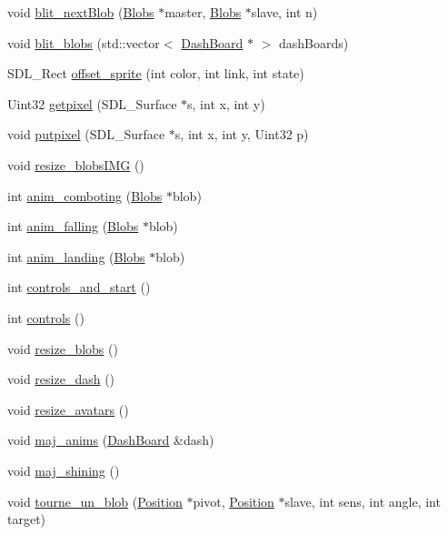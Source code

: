 \begin{DoxyCompactItemize}
\item 
void \hyperlink{a00011_a98196e7e039d0613d157349b7a16149f}{blit\_\-nextBlob} (\hyperlink{a00002}{Blobs} $\ast$master, \hyperlink{a00002}{Blobs} $\ast$slave, int n)
\item 
void \hyperlink{a00011_a30b3d0be2369fe70823507b30444401b}{blit\_\-blobs} (std::vector$<$ \hyperlink{a00006}{DashBoard} $\ast$ $>$ dashBoards)
\item 
SDL\_\-Rect \hyperlink{a00011_a4e2365dc147991810422dc3977b17d95}{offset\_\-sprite} (int color, int link, int state)
\item 
Uint32 \hyperlink{a00011_ad5f35be24aa0bcb7ad247d84056c1d1f}{getpixel} (SDL\_\-Surface $\ast$s, int x, int y)
\item 
void \hyperlink{a00011_a876abee7dcedec2e06d3a80cd482fd2b}{putpixel} (SDL\_\-Surface $\ast$s, int x, int y, Uint32 p)
\item 
void \hyperlink{a00011_a6cf97dcfc74a0bbcce08b6cf2b7a8aaa}{resize\_\-blobsIMG} ()
\item 
int \hyperlink{a00011_a9560986497eadbcec1245b55837b05c4}{anim\_\-comboting} (\hyperlink{a00002}{Blobs} $\ast$blob)
\item 
int \hyperlink{a00011_a9e3b255d376a942c02473defaf58c0d9}{anim\_\-falling} (\hyperlink{a00002}{Blobs} $\ast$blob)
\item 
int \hyperlink{a00011_ae177a43e82f45e6610d86baf7460da22}{anim\_\-landing} (\hyperlink{a00002}{Blobs} $\ast$blob)
\item 
int \hyperlink{a00011_a76916e87c447d621a562a766840fa0ba}{controls\_\-and\_\-start} ()
\item 
int \hyperlink{a00011_a518ceb8632ff76ce4a47e7a8955e82d1}{controls} ()
\item 
void \hyperlink{a00011_a836023020e0e313bd9fb00eee5dc8c91}{resize\_\-blobs} ()
\item 
void \hyperlink{a00011_a3d0e9c5cf58769f006904426dbde99be}{resize\_\-dash} ()
\item 
void \hyperlink{a00011_a1b054eb8feeb623d940e7c1400ea3417}{resize\_\-avatars} ()
\item 
void \hyperlink{a00011_a5bcad9348c35e0472ec0bb1bf66770fb}{maj\_\-anims} (\hyperlink{a00006}{DashBoard} \&dash)
\item 
void \hyperlink{a00011_a88af29fb328541af72b5a105fe8eafe6}{maj\_\-shining} ()
\item 
void \hyperlink{a00011_ad9dffbe4de7378738a1c0e9903462e30}{tourne\_\-un\_\-blob} (\hyperlink{a00014}{Position} $\ast$pivot, \hyperlink{a00014}{Position} $\ast$slave, int sens, int angle, int target)

\end{DoxyCompactItemize}
